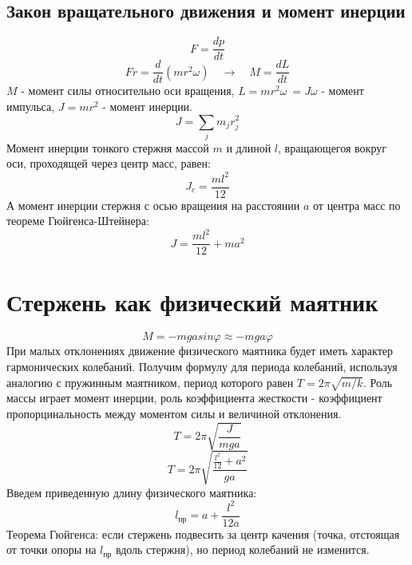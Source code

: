 \documentclass[a4paper,12pt]{article} %
\begin{document}
\subsection{Закон вращательного движения и момент инерции}
\begin{equation}\label{уравн-нью}
F = \frac{dp}{dt}
\end{equation}
\begin{equation}\label{уравн-нью}
Fr = \frac{d}{dt}(mr^2\omega) \quad \rightarrow \quad M = \frac{dL}{dt}
\end{equation}
$M$ - момент силы относительно оси вращения, $L = mr^2\omega\ = J\omega $ - момент импульса, $J = mr^2$ - момент инерции.
\begin{equation}
J = \sum_j m_jr_j^2
\end{equation}
Момент инерции тонкого стержня массой $m$ и длиной $l$, вращающегоя вокруг оси, проходящей через центр масс, равен: 
\begin{equation}
\label{инерциицм}
J_c=\frac{ml^2}{12}
\end{equation}
А момент инерции стержня с осью вращения на расстоянии $a$ от центра масс по теореме Гюйгенса-Штейнера:
\begin{equation}
\label{моментинерции}
J = \frac{ml^2}{12}+ma^2
\end{equation}
\section{Стержень как физический маятник}
\begin{equation}
\label{моменттяж}
M=-mgasin\varphi\approx-mga\varphi
\end{equation}
При малых отклонениях движение физического маятника будет иметь характер гармонических колебаний. Получим формулу для периода колебаний, используя аналогию с пружинным маятником, период которого равен $T=2\pi\sqrt{m/k}$. Роль массы играет момент инерции, роль коэффициента жесткости - коэффициент пропорцинальность между моментом силы и величиной отклонения.
\begin{equation}
\label{периодчерезинерции}
T=2\pi\sqrt{\frac{J}{mga}}
\end{equation} 
\begin{equation}
\label{период}
T=2\pi\sqrt{\frac{\frac{l^2}{12}+a^2}{ga}}
\end{equation}
Введем приведенную длину физического маятника:
\begin{equation}
\label{приведдлина}
l_\text{пр}=a+\frac{l^2}{12a}
\end{equation}
Теорема Гюйгенса: если стержень подвесить за центр качения (точка, отстоящая от точки опоры на $l_\text{пр}$ вдоль стержня), но период колебаний не изменится. 
\end{document}
